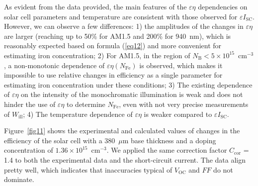 \documentclass[a4paper,fleqn]{cas-sc}
\begin{document}
As evident from the data provided, the main features of the $\varepsilon \eta$ dependencies on solar cell parameters and temperature are consistent with those observed for $\varepsilon I_\mathrm{SC}$. However, we can observe a few differences: 1) the amplitudes of the changes in $\varepsilon \eta$ are larger (reaching up to 50\% for AM1.5 and 200\% for 940~nm), which is reasonably expected based on formula (\ref{eq12}) and more convenient for estimating iron concentration; 2) For AM1.5, in the region of $N_\mathrm{B}<5\times10^{15}$~cm$^{-3}$, a non-monotonic dependence of $\varepsilon \eta$$\left(N_\mathrm{Fe}\right)$ is observed, which makes it impossible to use relative changes in efficiency as a single parameter for estimating iron concentration under these conditions; 3) The existing dependence of $\varepsilon \eta$ on the intensity of the monochromatic illumination is weak and does not hinder the use of $\varepsilon \eta$ to determine $N_\mathrm{Fe}$, even with not very precise measurements of $W_\mathrm{ill}$; 4) The temperature dependence of $\varepsilon \eta$ is weaker compared to $\varepsilon I_\mathrm{SC}$.

Figure~\ref{fig11} shows the experimental and calculated values of changes in the efficiency of the solar cell with a 380~$\mu$m base thickness and a doping concentration of $1.36\times10^{15}$~cm$^{-3}$. We applied the same correction factor $C_\mathrm{cor}$ = 1.4 to both the experimental data and the short-circuit current. The data align pretty well, which indicates that inaccuracies typical of $V_\mathrm{OC}$ and $FF$ do not dominate.
\end{document}
